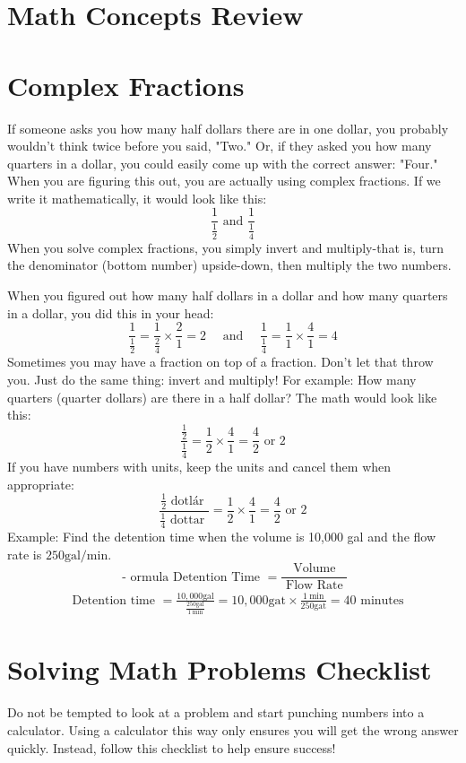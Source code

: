 \documentclass[10pt]{article}
\begin{document}
\section{Math Concepts Review}
\section{Complex Fractions}
If someone asks you how many half dollars there are in one dollar, you probably wouldn't think twice before you said, "Two." Or, if they asked you how many quarters in a dollar, you could easily come up with the correct answer: "Four." When you are figuring this out, you are actually using complex fractions. If we write it mathematically, it would look like this:
$$
\frac{1}{\frac{1}{2}} \text { and } \frac{1}{\frac{1}{4}}
$$
When you solve complex fractions, you simply invert and multiply-that is, turn the denominator (bottom number) upside-down, then multiply the two numbers.

When you figured out how many half dollars in a dollar and how many quarters in a dollar, you did this in your head:
$$
\frac{1}{\frac{1}{2}}=\frac{1}{\frac{2}{4}} \times \frac{2}{1}=2 \quad \text { and } \quad \frac{1}{\frac{1}{4}}=\frac{1}{1} \times \frac{4}{1}=4
$$
Sometimes you may have a fraction on top of a fraction. Don't let that throw you. Just do the same thing: invert and multiply! For example: How many quarters (quarter dollars) are there in a half dollar? The math would look like this:
$$
\frac{\frac{1}{2}}{\frac{1}{4}}=\frac{1}{2} \times \frac{4}{1}=\frac{4}{2} \text { or } 2
$$
If you have numbers with units, keep the units and cancel them when appropriate:
$$
\frac{\frac{1}{2} \text { dotlár }}{\frac{1}{4} \text { dottar }}=\frac{1}{2} \times \frac{4}{1}=\frac{4}{2} \text { or } 2
$$
Example: Find the detention time when the volume is 10,000 gal and the flow rate is $250 \mathrm{gal} / \mathrm{min}$.
$$
\text { - ormula Detention Time }=\frac{\text { Volume }}{\text { Flow Rate }}
$$
$$
\begin{aligned}
& \text { Detention time }=\frac{10,000 \mathrm{gal}}{\frac{250 \mathrm{gal}}{1 \mathrm{~min}}}=10,000 \mathrm{gat} \times \frac{1 \mathrm{~min}}{250 \mathrm{gat}}=40 \text { minutes } 
\end{aligned}
$$

\section{Solving Math Problems Checklist}
Do not be tempted to look at a problem and start punching numbers into a calculator. Using a calculator this way only ensures you will get the wrong answer quickly. Instead, follow this checklist to help ensure success!
\end{document}
